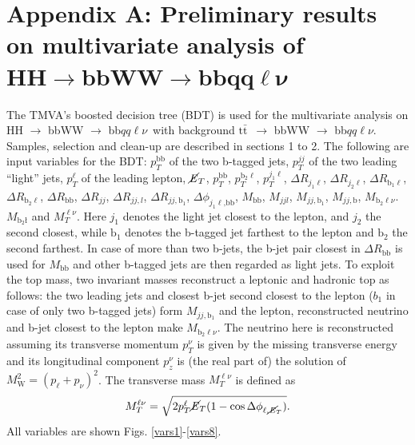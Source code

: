 \documentclass[10pt,a4paper]{article}
\renewcommand{\tt}{$\text{t}\bar{\text{t}}$}
\newcommand{\semi}{$\rightarrow$ bbWW $\rightarrow$ bb$qq\ell\nu$}
\newcommand{\lnu}{$\ell\nu$}
\newcommand{\bb}{\text{bb}}
\newcommand{\MET}{$\cancel{\it{E}}_{T}$}
\begin{document}
\section*{Appendix A: Preliminary results on multivariate analysis of\\ \mbox{$\bm{\text{HH} \rightarrow \text{bbWW} \rightarrow \text{bb} qq\ell\nu}$}}

The TMVA's boosted decision tree (BDT) is used for the multivariate analysis on HH \semi\ with background \tt\ \semi. Samples, selection and clean-up are described in sections 1 to 2. The following are input variables for the BDT:
$p_T^\text{bb}$ of the two b-tagged jets,
$p_T^{jj}$ of the two leading ``light'' jets,
$p_T^\ell$ of the leading lepton,
\MET,
$p_T^\text{bb}$,
$p_T^{\text{b}_2\ell}$,
$p_T^{j_1\ell}$,
$\Delta R_{j_1\ell}$,
$\Delta R_{j_2\ell}$,
$\Delta R_{\text{b}_1\ell}$,
$\Delta R_{\text{b}_2\ell}$,
$\Delta R_{\bb}$,
$\Delta R_{jj}$,
$\Delta R_{jj,l}$,
$\Delta R_{jj,\text{b}_1}$,
$\Delta\phi_{j_1\ell\text{,bb}}$,
$M_{\bb}$,
$M_{jjl}$,
$M_{jj,\text{b}_1}$,
$M_{jj,\text{b}}$,
$M_{\text{b}_2\text{\lnu}}$.
$M_{\text{b}_2\text{\l}}$ and
$M_T^{\ell\nu}$.
Here $j_1$ denotes the light jet closest to the lepton, and $j_2$ the second closest, while $\text{b}_1$ denotes the b-tagged jet farthest to the lepton and $\text{b}_2$ the second farthest. In case of more than two b-jets, the b-jet pair closest in $\Delta R_{\bb}$ is used for $M_{\bb}$ and other b-tagged jets are then regarded as light jets.
To exploit the top mass, two invariant masses reconstruct a leptonic and hadronic top as follows: the two leading jets and closest b-jet second closest to the lepton ($b_1$ in case of only two b-tagged jets) form $M_{jj,\text{b}_1}$ and the lepton, reconstructed neutrino and b-jet closest to the lepton make $M_{\text{b}_2\text{\lnu}}$. The neutrino here is reconstructed assuming its transverse momentum $p^\nu_T$ is given by the missing transverse energy and its longitudinal component $p^\nu_z$ is (the real part of) the solution of $M_\text{W}^2 = (p_\ell + p_\nu)^2$.
The transverse mass $M_T^{\ell\nu}$ is defined as
\begin{equation} \label{MT}
	M_T^{\ell\nu} = \sqrt{ 2 p_T^\ell \text{\MET} ( 1 - \cos \Delta \phi_{\ell,\text{\MET}} )}.
\end{equation}
All variables are shown Figs. \ref{vars1}-\ref{vars8}.
\end{document}
